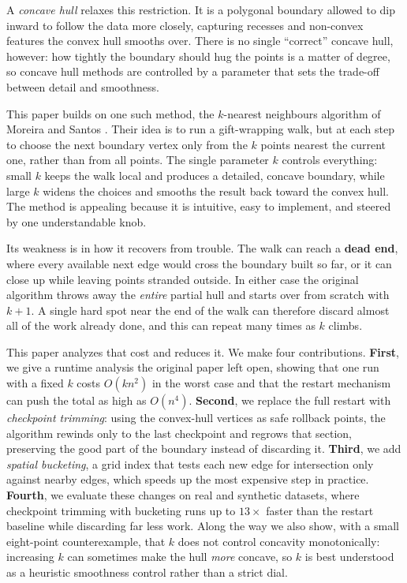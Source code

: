 \documentclass[a4paper,twoside]{article}
\begin{document}
A \emph{concave hull} relaxes this restriction. It is a polygonal boundary allowed to dip inward to follow the data more closely, capturing recesses and non-convex features the convex hull smooths over. There is no single ``correct'' concave hull, however: how tightly the boundary should hug the points is a matter of degree, so concave hull methods are controlled by a parameter that sets the trade-off between detail and smoothness.

This paper builds on one such method, the $k$-nearest neighbours algorithm of Moreira and Santos \cite{moreira2007}. Their idea is to run a gift-wrapping walk, but at each step to choose the next boundary vertex only from the $k$ points nearest the current one, rather than from all points. The single parameter $k$ controls everything: small $k$ keeps the walk local and produces a detailed, concave boundary, while large $k$ widens the choices and smooths the result back toward the convex hull. The method is appealing because it is intuitive, easy to implement, and steered by one understandable knob.

Its weakness is in how it recovers from trouble. The walk can reach a \textbf{dead end}, where every available next edge would cross the boundary built so far, or it can close up while leaving points stranded outside. In either case the original algorithm throws away the \emph{entire} partial hull and starts over from scratch with $k+1$. A single hard spot near the end of the walk can therefore discard almost all of the work already done, and this can repeat many times as $k$ climbs.

This paper analyzes that cost and reduces it. We make four contributions. \textbf{First}, we give a runtime analysis the original paper left open, showing that one run with a fixed $k$ costs $O(kn^2)$ in the worst case and that the restart mechanism can push the total as high as $O(n^4)$. \textbf{Second}, we replace the full restart with \emph{checkpoint trimming}: using the convex-hull vertices as safe rollback points, the algorithm rewinds only to the last checkpoint and regrows that section, preserving the good part of the boundary instead of discarding it. \textbf{Third}, we add \emph{spatial bucketing}, a grid index that tests each new edge for intersection only against nearby edges, which speeds up the most expensive step in practice. \textbf{Fourth}, we evaluate these changes on real and synthetic datasets, where checkpoint trimming with bucketing runs up to $13\times$ faster than the restart baseline while discarding far less work. Along the way we also show, with a small eight-point counterexample, that $k$ does not control concavity monotonically: increasing $k$ can sometimes make the hull \emph{more} concave, so $k$ is best understood as a heuristic smoothness control rather than a strict dial.
\end{document}
